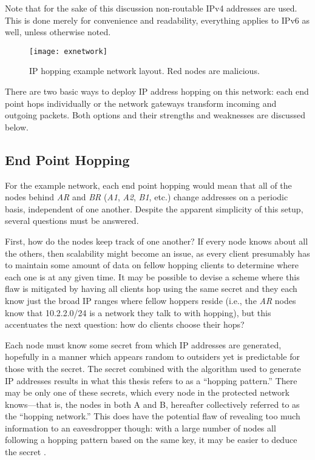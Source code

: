 \par Note that for the sake of this discussion non-routable \ac{IPv4} addresses are used. This is done merely for convenience and readability, everything applies to \ac{IPv6} as well, unless otherwise noted.

\begin{figure}
	\centering
	\texttt{[image: exnetwork]}
	\caption[\ac{IP} Hopping Example Network]{\ac{IP} hopping example network layout. Red nodes are malicious.}
	\label{fig:exnetwork}
\end{figure}

\par There are two basic ways to deploy IP address hopping on this network: each end point hops individually or the network gateways transform incoming and outgoing packets. Both options and their strengths and weaknesses are discussed below.

\subsection{End Point Hopping}
\par For the example network, each end point hopping would mean that all of the nodes behind \textit{AR} and \textit{BR} (\textit{A1}, \textit{A2}, \textit{B1}, etc.) change addresses on a periodic basis, independent of one another. Despite the apparent simplicity of this setup, several questions must be answered.

\par First, how do the nodes keep track of one another? If every node knows about all the others, then scalability might become an issue, as every client presumably has to maintain some amount of data on fellow hopping clients to determine where each one is at any given time. It may be possible to devise a scheme where this flaw is mitigated by having all clients hop using the same secret and they each know just the broad IP ranges where fellow hoppers reside (i.e., the \textit{AR} nodes know that 10.2.2.0/24 is a network they talk to with hopping), but this accentuates the next question: how do clients choose their hops?

\par Each node must know some secret from which \ac{IP} addresses are generated, hopefully in a manner which appears random to outsiders yet is predictable for those with the secret. The secret combined with the algorithm used to generate \ac{IP} addresses results in what this thesis refers to as a ``hopping pattern.'' There may be only one of these secrets, which every node in the protected network knows---that is, the nodes in both A and B, hereafter collectively referred to as the ``hopping network.'' This does have the potential flaw of revealing too much information to an eavesdropper though: with a large number of nodes all following a hopping pattern based on the same key, it may be easier to deduce the secret \cite{ShannonEntropy}.

